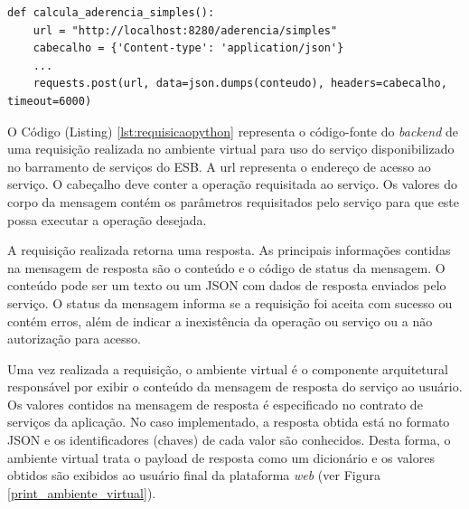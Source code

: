 
\begin{lstlisting}[caption={Requisição HTTP em Python utilizando a biblioteca Request.},label={lst:requisicaopython}]
def calcula_aderencia_simples():
    url = "http://localhost:8280/aderencia/simples"
    cabecalho = {'Content-type': 'application/json'}
    ...
    requests.post(url, data=json.dumps(conteudo), headers=cabecalho, timeout=6000)
\end{lstlisting}

O Código (Listing) \ref{lst:requisicaopython} representa o código-fonte do \textit{backend} de uma requisição realizada no ambiente virtual para uso do serviço disponibilizado no barramento de serviços do ESB. A url representa o endereço de acesso ao serviço. O cabeçalho deve conter a operação requisitada ao serviço. Os valores do corpo da mensagem contém os parâmetros requisitados pelo serviço para que este possa executar a operação desejada.

A requisição realizada retorna uma resposta. As principais informações contidas na mensagem de resposta são o conteúdo e o código de status da mensagem. O conteúdo pode ser um texto ou um JSON com dados de resposta enviados pelo serviço. O status da mensagem informa se a requisição foi aceita com sucesso ou contém erros, além de indicar a inexistência da operação ou serviço ou a não autorização para acesso.

Uma vez realizada a requisição, o ambiente virtual é o componente arquitetural responsável por exibir o conteúdo da mensagem de resposta do serviço ao usuário. Os valores contidos na mensagem de resposta é especificado no contrato de serviços da aplicação. No caso implementado, a resposta obtida está no formato JSON e os identificadores (chaves) de cada valor são conhecidos. Desta forma, o ambiente virtual trata o payload de resposta como um dicionário e os valores obtidos são exibidos ao usuário final da plataforma \textit{web} (ver Figura \ref{print_ambiente_virtual}).


